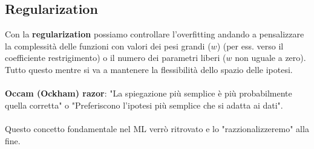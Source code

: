 \subsection{Regularization}
Con la \textbf{regularization} possiamo controllare l'overfitting andando a pensalizzare la complessità delle funzioni con valori dei pesi grandi ($w$) (per ess.
verso il coefficiente restrigimento) o il numero dei parametri liberi ($w$ non uguale a zero). Tutto questo mentre si va a mantenere la flessibilità dello spazio
delle ipotesi.\\\\
\textbf{Occam (Ockham) razor}: "La spiegazione più semplice è più probabilmente quella corretta" o "Preferiscono l’ipotesi più semplice che si adatta ai dati".\\\\
Questo concetto fondamentale nel ML verrò ritrovato e lo "razzionalizzeremo" alla fine.

